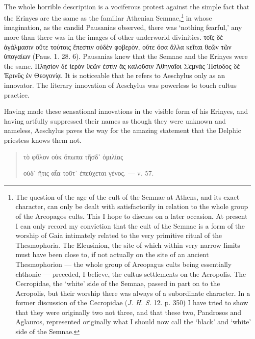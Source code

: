 \documentclass[a4paper, 11pt, oneside, polutonikogreek, english]{article}
\begin{document}
\paragraph{}
The whole horrible description is a vociferous protest against the simple fact that the Erinyes are the same as the familiar Athenian Semnae,\footnote{The question of the age of the cult of the Semnae at Athens, and its exact character, can only be dealt with satisfactorily in relation to the whole group of the Areopagos cults. This I hope to discuss on a later occasion. At present I can only record my conviction that the cult of the Semnae is a form of the worship of Gaia intimately related to the very primitive ritual of the Thesmophoria. The Eleusinion, the site of which within very narrow limits must have been close to, if not actually on the site of an ancient Thesmophorion --- the whole group of Areopagus cults being essentially chthonic --- preceded, I believe, the cultus settlements on the Acropolis. The Cecropidae, the `white' side of the Semnae, passed in part on to the Acropolis, but their worship there was always of a subordinate character. In a former discussion of the Cecropidae (\emph{J. H. S.} 12. p. 350) I have tried to show that they were originally two not three, and that these two, Pandrosos and Aglauros, represented originally what I should now call the `black' and `white' side of the Semnae.} in whose imagination, as the candid Pausanias observed, there was `nothing fearful,' any more than there was in the images of other underworld divinities. τοῖς δὲ ἀγάλμασιν οὔτε τούτοις ἔπεστιν οὐδὲν φοβερὸν, οὔτε ὅσα ἄλλα κεῖται θεῶν τῶν ὑπογαίων (Paus. 1. 28. 6). Pausanias knew that the Semnae and the Erinyes were the same. Πλησίον δὲ ἱερὸν θεῶν ἐστὶν ἃς καλοῦσιν Ἀθηναῖοι Σεμνὰς Ἠσίοδος δὲ Ἐρινῦς ἐν Θεογονίᾳ. It is noticeable that he refers to Aeschylus only as an innovator. The literary innovation of Aeschylus was powerless to touch cultus practice.

Having made these sensational innovations in the visible form of his Erinyes, and having artfully suppressed their names as though they were unknown and nameless, Aeschylus paves the way for the amazing statement that the Delphic priestess knows them not.
\begin{quotation}
τὸ φῦλον οὐκ ὅπωπα τῆσδ᾽ ὁμιλίας

οὐδ᾽ ἥτις αἷα τοῦτ᾽ ἐπεύχεται γένος. --- v. 57.
\end{quotation}
\end{document}
